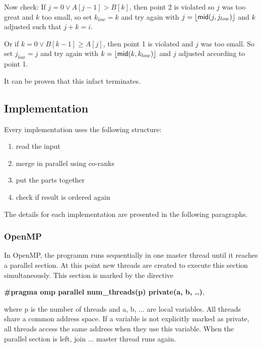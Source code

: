Now check:
If $j=0 \vee A[j-1] > B[k]$, then point 2 is violated so $j$ was too great and $k$ too small,
so set $k_{low}=k$ and try again with $j = \floor*{\middlee(j,j_{low})}$ and $k$ adjusted such that $j + k = i$.

Or if $k=0 \vee B[k-1] \geq A[j]$, then point 1 is violated and $j$ was too small.
So set $j_{low}=j$ and try again with $k = \floor*{\middlee(k,k_{low})}$ and $j$ adjusted according to point 1.

It can be proven that this infact terminates.

%


\subsection{Implementation}
Every implementation uses the following structure:
\begin{enumerate}
  \item read the input
  \item merge in parallel using co-ranks
  \item put the parts together
  \item check if result is ordered again
\end{enumerate}
The details for each implementation are presented in the following paragraphs.

\subsubsection{OpenMP}
In OpenMP, the programm runs sequentially in one master thread until it reaches a parallel section.
At this point new threads are created to execute this section simultaneously.
This section is marked by the directive

\textbf{\#pragma omp parallel num\_threads(p) private(a, b, ..)},

where p is the number of threads and a, b, ... are local variables.
All threads share a common address space.
If a variable is not explicitly marked as private, all threads access the same address when they use this variable.
When the parallel section is left, join ... master thread runs again.

